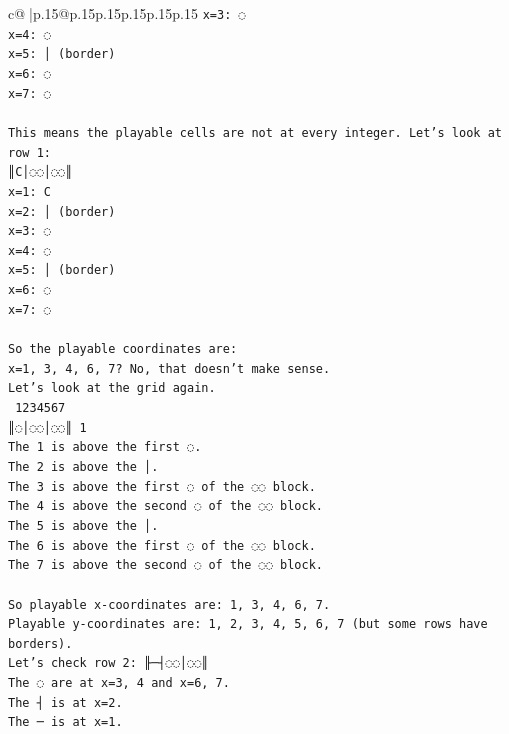 \documentclass{article}
\begin{document}
{\begin{supertabular}{c@{$\;$}|p{.15\linewidth}@{}p{.15\linewidth}p{.15\linewidth}p{.15\linewidth}p{.15\linewidth}p{.15\linewidth}}
{{{\texttt{x=3: ◌} \\
\texttt{x=4: ◌} \\
\texttt{x=5: │ (border)} \\
\texttt{x=6: ◌} \\
\texttt{x=7: ◌} \\
\\ 
\texttt{This means the playable cells are not at every integer. Let's look at row 1:} \\
\texttt{║C│◌◌│◌◌║} \\
\texttt{x=1: C} \\
\texttt{x=2: │ (border)} \\
\texttt{x=3: ◌} \\
\texttt{x=4: ◌} \\
\texttt{x=5: │ (border)} \\
\texttt{x=6: ◌} \\
\texttt{x=7: ◌} \\
\\ 
\texttt{So the playable coordinates are:} \\
\texttt{x=1, 3, 4, 6, 7? No, that doesn't make sense.} \\
\texttt{Let's look at the grid again.} \\
\texttt{ 1234567} \\
\texttt{║◌│◌◌│◌◌║ 1} \\
\texttt{The 1 is above the first ◌.} \\
\texttt{The 2 is above the │.} \\
\texttt{The 3 is above the first ◌ of the ◌◌ block.} \\
\texttt{The 4 is above the second ◌ of the ◌◌ block.} \\
\texttt{The 5 is above the │.} \\
\texttt{The 6 is above the first ◌ of the ◌◌ block.} \\
\texttt{The 7 is above the second ◌ of the ◌◌ block.} \\
\\ 
\texttt{So playable x{-}coordinates are: 1, 3, 4, 6, 7.} \\
\texttt{Playable y{-}coordinates are: 1, 2, 3, 4, 5, 6, 7 (but some rows have borders).} \\
\texttt{Let's check row 2: ╟─┤◌◌│◌◌║} \\
\texttt{The ◌ are at x=3, 4 and x=6, 7.} \\
\texttt{The ┤ is at x=2.} \\
\texttt{The ─ is at x=1.} \\
\\ 
}}}
\end{supertabular}}
\end{document}
